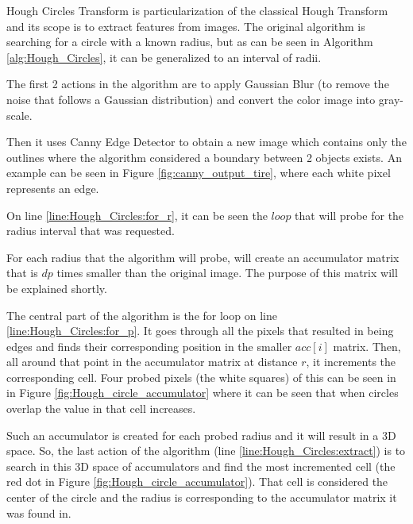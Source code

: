 Hough Circles Transform is particularization of the classical Hough Transform \cite{site:circular_hough_transform} and its scope is to extract features from images. The original algorithm is searching for a circle with a known radius, but as can be seen in Algorithm \ref{alg:Hough_Circles}, it can be generalized to an interval of radii.

The first 2 actions in the algorithm are to apply Gaussian Blur \cite{site:Gaussian_blur} (to remove the noise that follows a Gaussian distribution) and convert the color image into gray-scale.

Then it uses Canny Edge Detector \cite{site:Canny_edge_detection} to obtain a new image which contains only the outlines where the algorithm considered a boundary between 2 objects exists. An example can be seen in Figure \ref{fig:canny_output_tire}, where each white pixel represents an edge.

On line \ref{line:Hough_Circles:for_r}, it can be seen the $loop$ that will probe for the radius interval that was requested.

For each radius that the algorithm will probe, will create an accumulator matrix that is $dp$ times smaller than the original image. The purpose of this matrix will be explained shortly.

The central part of the algorithm is the for loop on line \ref{line:Hough_Circles:for_p}. It goes through all the pixels that resulted in being edges and finds their corresponding position in the smaller $acc[i]$ matrix. Then, all around that point in the accumulator matrix at distance $r$, it increments the corresponding cell. Four probed pixels (the white squares) of this can be seen in in Figure \ref{fig:Hough_circle_accumulator} where it can be seen that when circles overlap the value in that cell increases.

Such an accumulator is created for each probed radius and it will result in a 3D space. So, the last action of the algorithm (line \ref{line:Hough_Circles:extract}) is to search in this 3D space of accumulators and find the most incremented cell (the red dot in Figure \ref{fig:Hough_circle_accumulator}). That cell is considered the center of the circle and the radius is corresponding to the accumulator matrix it was found in.

